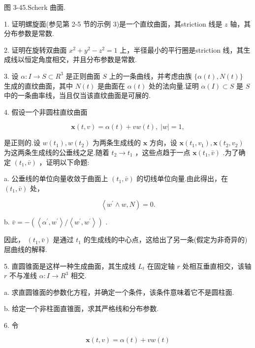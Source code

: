图 3-45.Scherk 曲面.

\exerciseline

1. 证明螺旋面(参见第 2-5 节的示例 3)是一个直纹曲面，其striction 线是 \(z\) 轴，其分布参数是常数.

2. 证明在旋转双曲面 \({x}^{2} + {y}^{2} - {z}^{2} = 1\) 上，半径最小的平行圈是striction 线，其生成线以恒定角度相交，并且分布参数是常数.

3. 设 \(\alpha  : I \rightarrow  S \subset  {R}^{3}\) 是正则曲面 \(S\) 上的一条曲线，并考虑由族 \(\{ \alpha \left( t\right) ,N\left( t\right) \}\) 生成的直纹曲面，其中 \(N\left( t\right)\) 是曲面在 \(\alpha \left( t\right)\) 处的法向量.证明 \(\alpha \left( I\right)  \subset  S\) 是 \(S\) 中的一条曲率线，当且仅当该直纹曲面是可展的.

4. 假设一个非圆柱直纹曲面

\[
\mathbf{x}\left( {t,v}\right)  = \alpha \left( t\right)  + {vw}\left( t\right) ,\;\left| w\right|  = 1,
\]

是正则的.设 \(w\left( {t}_{1}\right) ,w\left( {t}_{2}\right)\) 为两条生成线的 \(\mathbf{x}\) 方向，设 \(\mathbf{x}\left( {{t}_{1},{v}_{1}}\right) ,\mathbf{x}\left( {{t}_{2},{v}_{2}}\right)\) 为这两条生成线的公垂线之足.随着 \({t}_{2} \rightarrow  {t}_{1}\) ，这些点趋于一点 \(\mathbf{x}\left( {{t}_{1},\bar{v}}\right)\) .为了确定 \(\left( {{t}_{1},\bar{v}}\right)\) ，证明以下命题:

a. 公垂线的单位向量收敛于曲面上 \(\left( {{t}_{1},\bar{v}}\right)\) 的切线单位向量.由此得出，在 \(\left( {{t}_{1},\bar{v}}\right)\) 处，

\[
\left\langle  {{w}^{\prime } \land  w,N}\right)  = 0.
\]

b. \(\bar{v} =  - \left( {\left\langle  {{\alpha }^{\prime },{w}^{\prime }}\right\rangle  /\left\langle  {{w}^{\prime },{w}^{\prime }}\right\rangle  }\right)\) .

因此， \(\left( {{t}_{1},\bar{v}}\right)\) 是通过 \({t}_{1}\) 的生成线的中心点，这给出了另一条(假定为非奇异的)屈曲线的解释.

5. 直圆锥面是这样一种生成曲面，其生成线 \({L}_{t}\) 在固定轴 \(r\) 处相互垂直相交，该轴 \(r\) 不与准线 \(\alpha  : I \rightarrow  {R}^{3}\) 相交.

a. 求直圆锥面的参数化方程，并确定一个条件，该条件意味着它不是圆柱面.

b. 给定一个非柱面直锥面，求其严格线和分布参数.

6. 令

\[
\mathbf{x}\left( {t,v}\right)  = \alpha \left( t\right)  + {vw}\left( t\right)
\]

